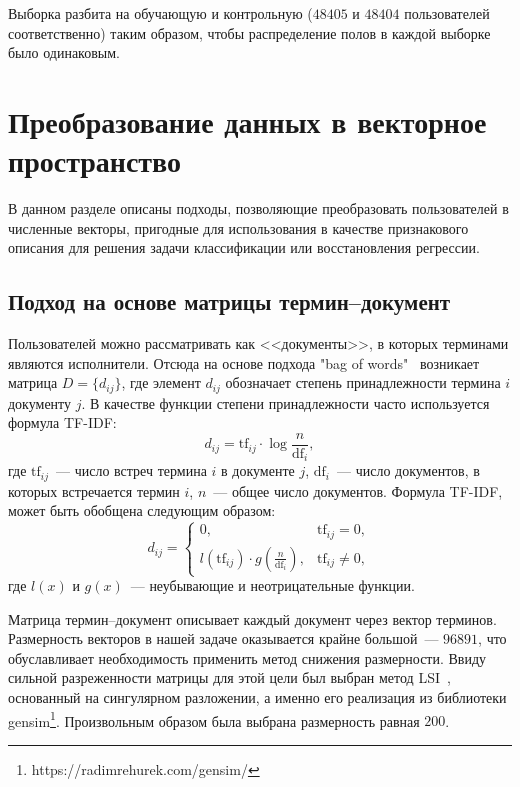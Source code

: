 \documentclass{spisok-article}
\begin{document}
Выборка разбита на обучающую и контрольную ($48405$ и $48404$
пользователей соответственно) таким образом, чтобы распределение
полов в каждой выборке было одинаковым.

\section{Преобразование данных в векторное пространство}

В данном разделе описаны подходы, позволяющие преобразовать
пользователей в численные векторы, пригодные для
использования в качестве признакового описания для решения
задачи классификации или восстановления регрессии.

\subsection{Подход на основе матрицы термин--документ}
Пользователей можно рассматривать как <<документы>>, в
которых терминами являются исполнители. Отсюда на основе
подхода "bag of words"~\cite{manning} 
возникает матрица $D = \{d_{ij}\}$, где элемент $d_{ij}$
обозначает степень принадлежности термина $i$ документу $j$.
В качестве функции степени принадлежности часто используется формула TF-IDF:
\begin{equation} \label{eq:tfidf}
    d_{ij} = \mathrm{tf}_{ij} \cdot \log{\frac{n}{\mathrm{df}_{i}}},
\end{equation}
где $\mathrm{tf}_{ij}$~--- число встреч термина $i$ в документе $j$,
$\mathrm{df}_{i}$~--- число документов, в которых встречается термин $i$,
$n$~--- общее число документов.
Формула TF-IDF, может быть обобщена следующим образом:
\begin{equation} \label{eq:general_tfidf}
d_{ij} = 
\begin{cases}
    0,& \mathrm{tf}_{ij} = 0,\\
    l(\mathrm{tf}_{ij}) \cdot g(\frac{n}{\mathrm{df}_{i}}),& \mathrm{tf}_{ij} \ne 0,
\end{cases}
\end{equation}
где $l(x)$ и $g(x)$~--- неубывающие и неотрицательные функции.

Матрица термин--документ описывает каждый документ через вектор
терминов. Размерность векторов в нашей задаче оказывается
крайне большой~--- $96891$, что обуславливает необходимость 
применить метод снижения размерности. Ввиду сильной разреженности
матрицы для этой цели был выбран метод LSI~\cite{lsi}, основанный
на сингулярном разложении, а именно его реализация из библиотеки
gensim\footnote{https://radimrehurek.com/gensim/}. Произвольным
образом была выбрана размерность равная $200$. 
\end{document}
